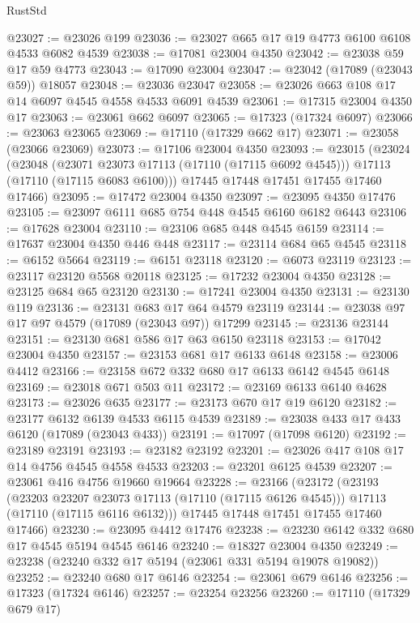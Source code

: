 \begin{lexlean}{RustStd}
\begin{coremodule}
@23027 := @23026 @199
@23036 := @23027 @665 @17 @19 @4773 @6100 @6108 @4533 @6082 @4539
@23038 := @17081 @23004 @4350
@23042 := @23038 @59 @17 @59 @4773
@23043 := @17090 @23004
@23047 := @23042 (@17089 (@23043 @59)) @18057
@23048 := @23036 @23047
@23058 := @23026 @663 @108 @17 @14 @6097 @4545 @4558 @4533 @6091 @4539
@23061 := @17315 @23004 @4350 @17
@23063 := @23061 @662 @6097
@23065 := @17323 (@17324 @6097)
@23066 := @23063 @23065
@23069 := @17110 (@17329 @662 @17)
@23071 := @23058 (@23066 @23069)
@23073 := @17106 @23004 @4350
@23093 := @23015
    (@23024
      (@23048
        (@23071 @23073 @17113 (@17110 (@17115 @6092 @4545)))
        @17113
        (@17110 (@17115 @6083 @6100)))
      @17445
      @17448
      @17451
      @17455
      @17460
      @17466)
@23095 := @17472 @23004 @4350
@23097 := @23095 @4350 @17476
@23105 := @23097 @6111 @685 @754 @448 @4545 @6160 @6182 @6443
@23106 := @17628 @23004
@23110 := @23106 @685 @448 @4545 @6159
@23114 := @17637 @23004 @4350 @446 @448
@23117 := @23114 @684 @65 @4545
@23118 := @6152 @5664
@23119 := @6151 @23118
@23120 := @6073 @23119
@23123 := @23117 @23120 @5568 @20118
@23125 := @17232 @23004 @4350
@23128 := @23125 @684 @65 @23120
@23130 := @17241 @23004 @4350
@23131 := @23130 @119
@23136 := @23131 @683 @17 @64 @4579 @23119
@23144 := @23038 @97 @17 @97 @4579 (@17089 (@23043 @97)) @17299
@23145 := @23136 @23144
@23151 := @23130 @681 @586 @17 @63 @6150 @23118
@23153 := @17042 @23004 @4350
@23157 := @23153 @681 @17 @6133 @6148
@23158 := @23006 @4412
@23166 := @23158 @672 @332 @680 @17 @6133 @6142 @4545 @6148
@23169 := @23018 @671 @503 @11
@23172 := @23169 @6133 @6140 @4628
@23173 := @23026 @635
@23177 := @23173 @670 @17 @19 @6120
@23182 := @23177 @6132 @6139 @4533 @6115 @4539
@23189 := @23038 @433 @17 @433 @6120 (@17089 (@23043 @433))
@23191 := @17097 (@17098 @6120)
@23192 := @23189 @23191
@23193 := @23182 @23192
@23201 := @23026 @417 @108 @17 @14 @4756 @4545 @4558 @4533
@23203 := @23201 @6125 @4539
@23207 := @23061 @416 @4756 @19660 @19664
@23228 := @23166
    (@23172
      (@23193
        (@23203 @23207 @23073 @17113 (@17110 (@17115 @6126 @4545)))
        @17113
        (@17110 (@17115 @6116 @6132)))
      @17445
      @17448
      @17451
      @17455
      @17460
      @17466)
@23230 := @23095 @4412 @17476
@23238 := @23230 @6142 @332 @680 @17 @4545 @5194 @4545 @6146
@23240 := @18327 @23004 @4350
@23249 := @23238 (@23240 @332 @17 @5194 (@23061 @331 @5194 @19078 @19082))
@23252 := @23240 @680 @17 @6146
@23254 := @23061 @679 @6146
@23256 := @17323 (@17324 @6146)
@23257 := @23254 @23256
@23260 := @17110 (@17329 @679 @17)

\end{coremodule}
\end{lexlean}
